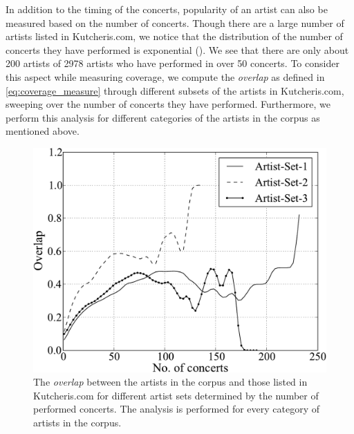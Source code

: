 In addition to the timing of the concerts, popularity of an artist can also be measured based on the number of concerts. Though there are a large number of artists listed in Kutcheris.com, we notice that the distribution of the number of concerts they have performed is exponential (). We see that there are only about 200 artists of 2978 artists who have performed in over 50 concerts. To consider this aspect while measuring coverage, we compute the \textit{overlap} as defined in \eqref{eq:coverage_measure} through different subsets of the artists in Kutcheris.com, sweeping over the number of concerts they have performed. Furthermore, we perform this analysis for different categories of the artists in the corpus as mentioned above.

\begin{figure}
	\begin{center}
		\includegraphics[width=\figSizeHundred]{ch04_datasets/figures/artist-coverage-vs-performances.pdf}
	\end{center}
	\caption{The \textit{overlap} between the artists in the corpus and those listed in Kutcheris.com for different artist sets determined by the number of performed concerts. The analysis is performed for every category of artists in the corpus.}
	\label{fig:artist_coverage_vs_number_of_concerts}
\end{figure}

